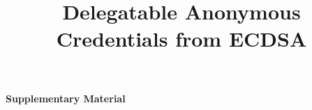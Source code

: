 \documentclass{article}
\title{Delegatable Anonymous Credentials from ECDSA}
\author{}
\date{}
\begin{document}
\maketitle

\begin{abstract}
\end{abstract}










\newpage



\newpage
\begin{center}
    \huge{\textbf{Supplementary Material}}
\end{center}
\end{document}
